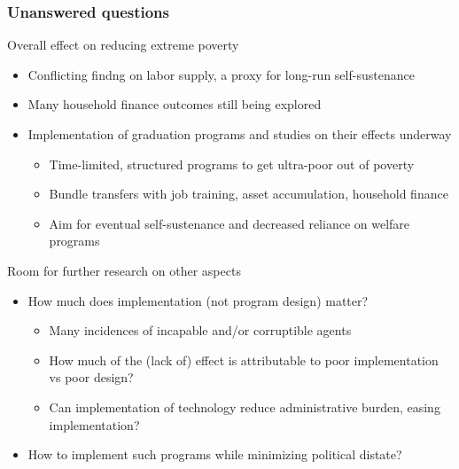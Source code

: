 \documentclass[aspectratio=169]{beamer}
\begin{document}
\begin{frame}
\frametitle{Unanswered questions}
Overall effect on reducing extreme poverty
\begin{itemize}\setlength\itemsep{3pt}
\item Conflicting findng on labor supply, a proxy for long-run self-sustenance
\item Many household finance outcomes still being explored
\item Implementation of graduation programs and studies on their effects underway
\begin{itemize}\setlength\itemsep{3pt}
\item Time-limited, structured programs to get ultra-poor out of poverty
\item Bundle transfers with job training, asset accumulation, household finance
\item Aim for eventual self-sustenance and decreased reliance on welfare programs
\end{itemize}
\end{itemize}\medskip

Room for further research on other aspects
\begin{itemize}\setlength\itemsep{3pt}
\item How much does implementation (not program design) matter?
\begin{itemize}\setlength\itemsep{3pt}
\item Many incidences of incapable and/or corruptible agents
\item How much of the (lack of) effect is attributable to poor implementation vs poor design?
\item Can implementation of technology reduce administrative burden, easing implementation?
\end{itemize}
\item How to implement such programs while minimizing political distate?
\end{itemize}
\end{frame}



\end{document}
